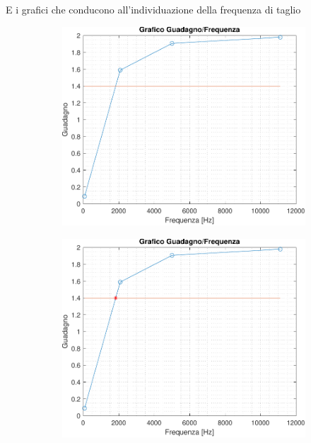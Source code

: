 \documentclass[a4paper, 12pt, twoside]{report}
\begin{document}
	\vspace{1.5cm}
	E i grafici che conducono all'individuazione della frequenza di taglio
	\begin{figure}[H]
		\hspace{-3cm}
		\centering
		\begin{subfigure}{.5\textwidth}
			\includegraphics[width=\textwidth]{imag/Gf_deamp}
			\caption{}
			\label{fig:gfdeamp}
		\end{subfigure}
		\hfill
		\begin{subfigure}{.5\textwidth}
			\includegraphics[width=\textwidth]{imag/Gf_ft}
			\caption{}
			\label{fig:gfft}
		\end{subfigure}
	\end{figure}
	
\end{document}
